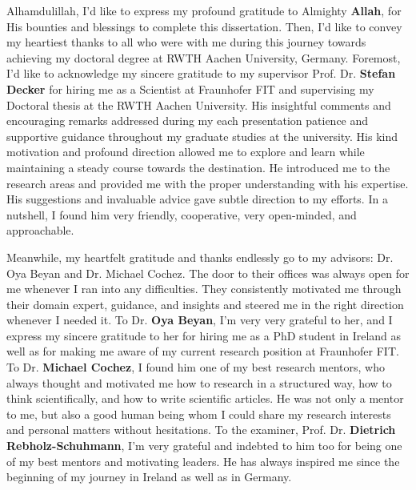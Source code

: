

\begin{acknowledgements}
    Alhamdulillah, I'd like to express my profound gratitude to Almighty \textbf{Allah}, for His bounties and blessings to complete this dissertation. Then, I'd like to convey my heartiest thanks to all who were with me during this journey towards achieving my doctoral degree at RWTH Aachen University, Germany. Foremost, I'd like to acknowledge my sincere gratitude to my supervisor Prof. Dr. \textbf{Stefan Decker} for hiring me as a Scientist at Fraunhofer FIT and supervising my Doctoral thesis at the RWTH Aachen University. His insightful comments and encouraging remarks addressed during my each presentation patience and supportive guidance throughout my graduate studies at the university. His kind motivation and profound direction allowed me to explore and learn while maintaining a steady course towards the destination. He introduced me to the research areas and provided me with the proper understanding with his expertise. His suggestions and invaluable advice gave subtle direction to my efforts. In a nutshell, I found him very friendly, cooperative, very open-minded, and approachable. 
    
    \hspace*{5mm} Meanwhile, my heartfelt gratitude and thanks endlessly go to my advisors: Dr. Oya Beyan and Dr. Michael Cochez. The door to their offices was always open for me whenever I ran into any difficulties. They consistently motivated me through their domain expert, guidance, and insights and steered me in the right direction whenever I needed it. To Dr. \textbf{Oya Beyan}, I'm very very grateful to her, and I express my sincere gratitude to her for hiring me as a PhD student in Ireland as well as for making me aware of my current research position at Fraunhofer FIT. %
    To Dr. \textbf{Michael Cochez}, I found him one of my best research mentors, who always thought and motivated me how to research in a structured way, how to think scientifically, and how to write scientific articles. He was not only a mentor to me, but also a good human being whom I could share my research interests and personal matters without hesitations. To the examiner, Prof. Dr. \textbf{Dietrich Rebholz-Schuhmann}, I'm very grateful and indebted to him too for being one of my best mentors and motivating leaders. He has always inspired me since the beginning of my journey in Ireland as well as in Germany. 
    

\end{acknowledgements}
